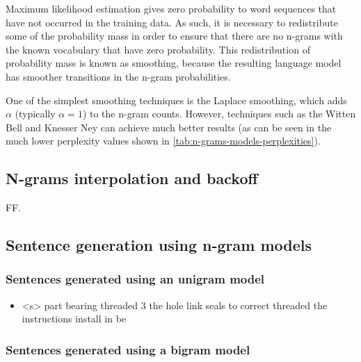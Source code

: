 Maximum likelihood estimation gives zero probability to word sequences that have not occurred in the training data. As such, it is necessary to redistribute some of the probability mass in order to ensure that there are no n-grams with the known vocabulary that have zero probability. This redistribution of probability mass is known as smoothing, because the resulting language model has smoother transitions in the n-gram probabilities.

One of the simplest smoothing techniques is the Laplace smoothing, which adds $\alpha$ (typically $\alpha=1$) to the n-gram counts. However, techniques such as the Witten Bell and Knesser Ney can achieve much better results (as can be seen in the much lower perplexity values shown in \cref{tab:n-grams-models-perplexities}).



\subsection{N-grams interpolation and backoff}

FF.



\subsection{Sentence generation using n-gram models}

\subsubsection{Sentences generated using an unigram model}

\begin{itemize}
	\item <s> part bearing threaded 3 the hole link seals to correct threaded the instructions install in be
\end{itemize}


\subsubsection{Sentences generated using a bigram model}

